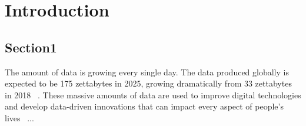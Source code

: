 \chapter{Introduction}
\begin{refsection}
\clearpage

\section{Section1}

The amount of data is growing every single day. The data produced globally is expected to be 175 zettabytes in 2025, growing dramatically from 33 zettabytes in 2018 ~\cite{european_commission_proposal_2020}. These massive amounts of data are used to improve digital technologies and develop data-driven innovations that can impact every aspect of people's lives ~\cite{european_commission_directorate_general_for_communications_networks_content_and_technology_study_2021}...

\printbibliography[heading=subbibintoc]
\end{refsection}

